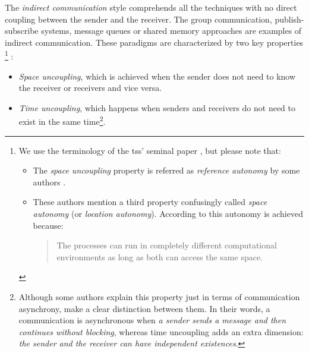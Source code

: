 The \emph{indirect communication} style comprehends all the techniques with no direct coupling between the sender and the receiver.
The group communication, publish-subscribe systems, message queues or shared memory approaches are examples of indirect communication.
These paradigms are characterized by two key properties \citep{gelernter_generative_1985,coulouris_distributed_2012}
\footnote{
  We use the terminology of the  \aclp{ts}' seminal paper \citep{gelernter_generative_1985}, but please note that:
  \begin{itemize}
    \item The \emph{space uncoupling} property is referred as \emph{reference autonomy} by some authors \citep{fensel_triple-space_2004}.
    \item These authors mention a third property confusingly called \emph{space autonomy} (or \emph{location autonomy}).
	  According to \citet{fensel_triple-space_2004} this autonomy is achieved because:
	  \begin{quote}
	    The processes can run in completely different computational environments as long as both can access the same space.
	  \end{quote}
  \end{itemize}
}
:

\begin{itemize}
 \item \emph{Space uncoupling}, which is achieved when the sender does not need to know the receiver or receivers and vice versa.
 \item \emph{Time uncoupling}, which happens when senders and receivers do not need to exist in the same time\footnote{
	  Although some authors \citep{fensel_triple-space_2004,krummenacher_www_2005} explain this property just in terms of communication asynchrony,
	  \citet{coulouris_distributed_2012} make a clear distinction between them.
	  In their words, a communication is asynchronous when \emph{a sender sends a message and then continues without blocking},
	  whereas time uncoupling adds an extra dimension: \emph{the sender and the receiver can have independent existences}.
	  }.
 
\end{itemize}

